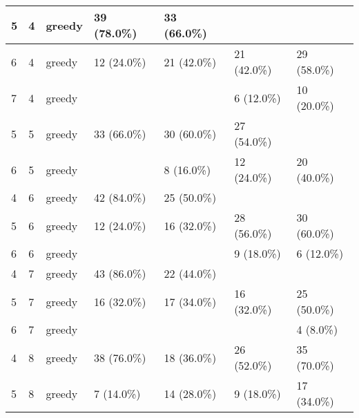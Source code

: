 \documentclass[oneside,canadian,landscape]{article}
\begin{document}
\begin{center}
\begin{longtable}{|l|l|l||l|l|l|l|}
5&4&greedy&39 (78.0\%)&33 (66.0\%)&&\\ \hline
6&4&greedy&12 (24.0\%)&21 (42.0\%)&21 (42.0\%)&29 (58.0\%)\\ \hline
7&4&greedy&&&6 (12.0\%)&10 (20.0\%)\\ \hline
5&5&greedy&33 (66.0\%)&30 (60.0\%)&27 (54.0\%)&\\ \hline
6&5&greedy&&8 (16.0\%)&12 (24.0\%)&20 (40.0\%)\\ \hline
4&6&greedy&42 (84.0\%)&25 (50.0\%)&&\\ \hline
5&6&greedy&12 (24.0\%)&16 (32.0\%)&28 (56.0\%)&30 (60.0\%)\\ \hline
6&6&greedy&&&9 (18.0\%)&6 (12.0\%)\\ \hline
4&7&greedy&43 (86.0\%)&22 (44.0\%)&&\\ \hline
5&7&greedy&16 (32.0\%)&17 (34.0\%)&16 (32.0\%)&25 (50.0\%)\\ \hline
6&7&greedy&&&&4 (8.0\%)\\ \hline
4&8&greedy&38 (76.0\%)&18 (36.0\%)&26 (52.0\%)&35 (70.0\%)\\ \hline
5&8&greedy&7 (14.0\%)&14 (28.0\%)&9 (18.0\%)&17 (34.0\%)\\ \hline
\end{longtable}
\end{center}
\end{document}
